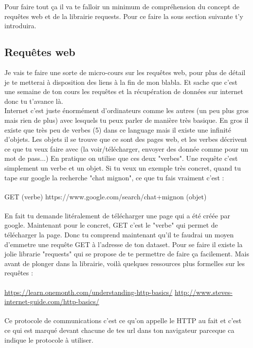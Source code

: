 \documentclass[10pt,a4paper]{book}
\begin{document}
Pour faire tout ça il va te falloir un minimum de compréhension du concept de requêtes web et de la librairie requests.
Pour ce faire la sous section suivante t'y introduira.
\subsection{Requêtes web}
Je vais te faire une sorte de micro-cours sur les requêtes web, pour plus de détail je te metterai à disposition des liens à la fin de mon blabla. Et sache que c'est une semaine de ton cours les requêtes et la récupération de données sur internet donc tu t'avance là. 
\\
Internet c'est juste énormément d'ordinateurs comme les autres (un peu plus gros mais rien de plus) avec lesquels tu peux parler de manière très basique. En gros il existe que très peu de verbes (5) dans ce language mais il existe une infinité d'objets. Les objets il se trouve que ce sont des pages web, et les verbes décrivent ce que tu veux faire avec (la voir/télécharger, envoyer des donnée comme pour un mot de pass...) En pratique on utilise que ces deux "verbes". Une requête c'est simplement un verbe et un objet. Si tu veux un exemple très concret, quand tu tape sur google la recherche "chat mignon", ce que tu fais vraiment c'est :
\\\\
GET (verbe) https://www.google.com/search/chat+mignon (objet) 
\\\\
En fait tu demande litéralement de télécharger une page qui a été créée par google. 
Maintenant pour le concret, GET c'est le "verbe" qui permet de télécharger la page. Donc tu comprend maintenant qu'il te faudrai un moyen d'emmetre une requête GET à l'adresse de ton dataset. Pour se faire il existe la jolie librarie "requests" qui se propose de te permettre de faire ça facilement. Mais avant de plonger dans la librairie, voilà quelques ressources plus formelles sur les requêtes :
\\\\
\url{https://learn.onemonth.com/understanding-http-basics/}
\url{http://www.steves-internet-guide.com/http-basics/}
\\\\
Ce protocole de communications c'est ce qu'on appelle le HTTP au fait et c'est ce qui est marqué devant chacune de tes url dans ton navigateur parceque ca indique le protocole à utiliser.
\end{document}
